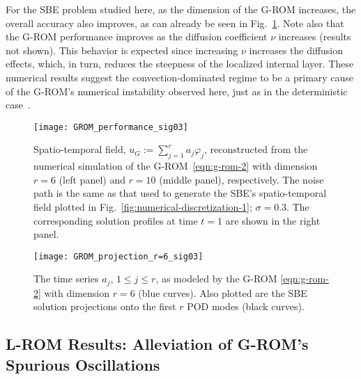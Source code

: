 \documentclass[11pt]{amsart}
\numberwithin{equation}{section}
\begin{document}
For the SBE problem studied here, as the dimension of the G-ROM increases, the overall accuracy also improves, as can already be seen in Fig.~\ref{fig:questions-1-2-1}. 
Note also that the G-ROM performance improves as the diffusion coefficient $\nu$ increases (results not shown). This behavior is expected since increasing $\nu$ increases the diffusion effects, which, in turn, reduces the steepness of the localized internal layer. These numerical results suggest the convection-dominated regime to be a primary cause of the G-ROM's numerical instability observed here, just as in the deterministic case~\cite{wells2016regularized}.


\begin{figure}%
\begin{center}
	\texttt{[image: GROM\_performance\_sig03]}	
	\caption{
	Spatio-temporal field, $u_G:=\sum_{j=1}^r a_j \varphi_j$, reconstructed from the numerical simulation of the G-ROM~\eqref{eqn:g-rom-2} with dimension $r=6$ (left panel) and $r=10$ (middle panel), respectively. The noise path is the same as that used to generate the SBE's spatio-temporal field plotted in Fig.~\ref{fig:numerical-discretization-1}; $\sigma=0.3$.  The corresponding solution profiles at time $t=1$ are shown in the right panel. 
	}
	\label{fig:questions-1-2-1} 
	\end{center}
\end{figure}

\begin{figure} %
\begin{center}
	\texttt{[image: GROM\_projection\_r=6\_sig03]}	
	\caption{
	The time series $a_j$, $1\le j \le r$, as modeled by the G-ROM \eqref{eqn:g-rom-2} with dimension $r=6$ (blue curves). Also plotted are the SBE solution projections onto the first $r$ POD modes (black curves).  
	}
	\label{fig:GROM_projection} 
	\end{center}
\end{figure}


 
\subsection{L-ROM Results: Alleviation of G-ROM's Spurious Oscillations}
	\label{sec:question-3}
\end{document}
